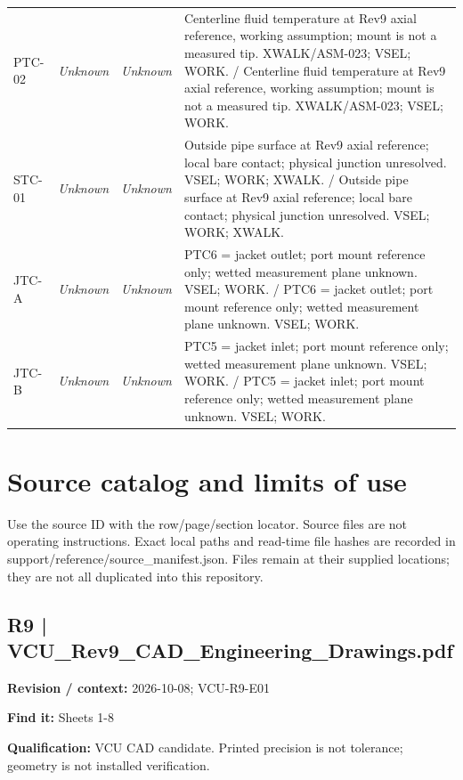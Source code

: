 \documentclass[11pt]{article}
\begin{document}
\begin{longtable}{>{\raggedright\arraybackslash}p{}>{\raggedright\arraybackslash}p{}>{\raggedright\arraybackslash}p{}>{\raggedright\arraybackslash}p{}}
PTC-02 & \textit{Unknown} & \textit{Unknown} & Centerline fluid temperature at Rev9 axial reference, working assumption; mount is not a measured tip. XWALK/ASM-023; VSEL; WORK. / Centerline fluid temperature at Rev9 axial reference, working assumption; mount is not a measured tip. XWALK/ASM-023; VSEL; WORK. \\[3pt]
STC-01 & \textit{Unknown} & \textit{Unknown} & Outside pipe surface at Rev9 axial reference; local bare contact; physical junction unresolved. VSEL; WORK; XWALK. / Outside pipe surface at Rev9 axial reference; local bare contact; physical junction unresolved. VSEL; WORK; XWALK. \\[3pt]
JTC-A & \textit{Unknown} & \textit{Unknown} & PTC6 = jacket outlet; port mount reference only; wetted measurement plane unknown. VSEL; WORK. / PTC6 = jacket outlet; port mount reference only; wetted measurement plane unknown. VSEL; WORK. \\[3pt]
JTC-B & \textit{Unknown} & \textit{Unknown} & PTC5 = jacket inlet; port mount reference only; wetted measurement plane unknown. VSEL; WORK. / PTC5 = jacket inlet; port mount reference only; wetted measurement plane unknown. VSEL; WORK. \\[3pt]
\bottomrule\end{longtable}\normalsize
\clearpage\section{Source catalog and limits of use}\label{sources-detail}
Use the source ID with the row/page/section locator. Source files are not operating instructions. Exact local paths and read-time file hashes are recorded in support/reference/source\_manifest.json. Files remain at their supplied locations; they are not all duplicated into this repository.
\par\noindent\begin{minipage}{\textwidth}\small
\subsection*{R9 | VCU\_\allowbreak{}Rev9\_\allowbreak{}CAD\_\allowbreak{}Engineering\_\allowbreak{}Drawings.pdf}
\textbf{Revision / context:} 2026-10-08; VCU-R9-E01\par
\textbf{Find it:} Sheets 1-8\par
\textbf{Qualification:} VCU CAD candidate. Printed precision is not tolerance; geometry is not installed verification.\par
\end{minipage}\par\vspace{5pt}
\end{document}
